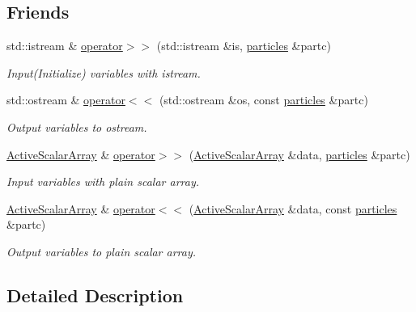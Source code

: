 \subsection*{Friends}
\begin{DoxyCompactItemize}
\item 
std\+::istream \& \mbox{\hyperlink{classparticles_a76cf6d70e3bd56bf748fbbde009dd88e}{operator$>$$>$}} (std\+::istream \&is, \mbox{\hyperlink{classparticles}{particles}} \&partc)
\begin{DoxyCompactList}\small\item\em Input(\+Initialize) variables with istream. \end{DoxyCompactList}\item 
std\+::ostream \& \mbox{\hyperlink{classparticles_ad63b4422bc47e18c1398e1f69656f66e}{operator$<$$<$}} (std\+::ostream \&os, const \mbox{\hyperlink{classparticles}{particles}} \&partc)
\begin{DoxyCompactList}\small\item\em Output variables to ostream. \end{DoxyCompactList}\item 
\mbox{\hyperlink{classparticles_a1a7d26adb64aacc4201e6bbb9de64c47}{Active\+Scalar\+Array}} \& \mbox{\hyperlink{classparticles_ae3639692fea4ca2a3f9d017c8f0f8dc2}{operator$>$$>$}} (\mbox{\hyperlink{classparticles_a1a7d26adb64aacc4201e6bbb9de64c47}{Active\+Scalar\+Array}} \&data, \mbox{\hyperlink{classparticles}{particles}} \&partc)
\begin{DoxyCompactList}\small\item\em Input variables with plain scalar array. \end{DoxyCompactList}\item 
\mbox{\hyperlink{classparticles_a1a7d26adb64aacc4201e6bbb9de64c47}{Active\+Scalar\+Array}} \& \mbox{\hyperlink{classparticles_a4ea2cae8268f24456db3fcb615e36c29}{operator$<$$<$}} (\mbox{\hyperlink{classparticles_a1a7d26adb64aacc4201e6bbb9de64c47}{Active\+Scalar\+Array}} \&data, const \mbox{\hyperlink{classparticles}{particles}} \&partc)
\begin{DoxyCompactList}\small\item\em Output variables to plain scalar array. \end{DoxyCompactList}\end{DoxyCompactItemize}


\subsection{Detailed Description}

